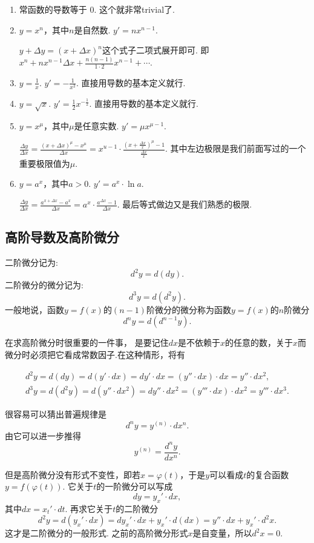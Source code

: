 \documentclass{article}
\begin{document}
\begin{enumerate}
	\item 常函数的导数等于{ \color{blue} $0$}. 这个就非常trivial了.
	\item $y=x^n$，其中$n$是自然数. {\color{blue} $y' = nx^{n-1}.$}

$y+\Delta y = (x+\Delta x)^n$这个式子二项式展开即可. 即$x^n + nx^{n-1}\Delta x + \frac{n(n-1)}{1 \cdot 2}x^{n-1}+ \cdots$.	
	
	\item $y=\frac{1}{x}$. {\color{blue} $y'=-\frac{1}{x^2}$}. 直接用导数的基本定义就行.
	\item $y=\sqrt{x}$. {\color{blue} $y' = \frac{1}{2}x^{-\frac{1}{2}}$.} 直接用导数的基本定义就行.
	\item $y=x^\mu$，其中$\mu$是任意实数. {\color{blue} $y' = \mu x^{\mu - 1}$.}
	
$\frac{\Delta y}{\Delta x} =  \frac{(x+\Delta x)^{\mu} - x^\mu}{\Delta x} =  x^{u-1} \cdot  \frac{(x+\frac{\Delta x}{x})^\mu - 1}{\frac{\Delta x}{x}}$. 其中左边极限是我们前面写过的一个重要极限值为$\mu$.	
	\item $y=a^x$，其中$a >0$. { \color{blue} $y' = a^x \cdot \ln a$.}
	
$\frac{\Delta y}{\Delta x} =\frac{a^{x + \Delta x} - a^x}{\Delta x} =  a^x \cdot \frac{a^{\Delta x} - 1}{\Delta x}$. 最后等式做边又是我们熟悉的极限.
\end{enumerate}

\newpage
\subsection{高阶导数及高阶微分}

二阶微分记为:\[d^2 y =d(dy).\]二阶微分的微分记为:\[d^3 y = d(d^2 y).\]一般地说，函数$y=f(x)$的$(n-1)$阶微分的微分称为函数$y=f(x)$的$n$阶微分\[d^n y  = d(d^{n-1} y).\]

在求高阶微分时很重要的一件事，{\color{red} 是要记住$dx$是不依赖于$x$的任意的数，关于$x$而微分时必须把它看成常数因子}.在这种情形，将有

\begin{align*}
	d^2 y = d(dy) = d(y' \cdot dx) = dy' \cdot dx = (y'' \cdot dx) \cdot dx = y'' \cdot dx^2, \\
	d^3 y = d(d^2 y) = d(y'' \cdot dx^2) =dy'' \cdot dx^2 = (y'''\cdot dx)\cdot dx^2 = y''' \cdot dx^3.
\end{align*}

很容易可以猜出普遍规律是\[d^n y = y^{(n)} \cdot dx^n.\]由它可以进一步推得\[y^{(n)} = \frac{d^n y}{d x^n}.\]

{\color{blue} 但是高阶微分没有形式不变性}，即若$x = \varphi(t)$，于是$y$可以看成$t$的复合函数$y = f(\varphi(t))$. 它关于$t$的一阶微分可以写成\[dy =y_x' \cdot dx,\]其中$dx = x_t' \cdot dt$. 再求它关于$t$的二阶微分\[d^2 y = d(y_x' \cdot dx) = dy_x' \cdot dx + y_x' \cdot d(dx) = y'' \cdot dx + y_x' \cdot d^2 x.\]这才是二阶微分的一般形式. 之前的高阶微分形式$x$是自变量，所以$d^2 x = 0$.
\end{document}
